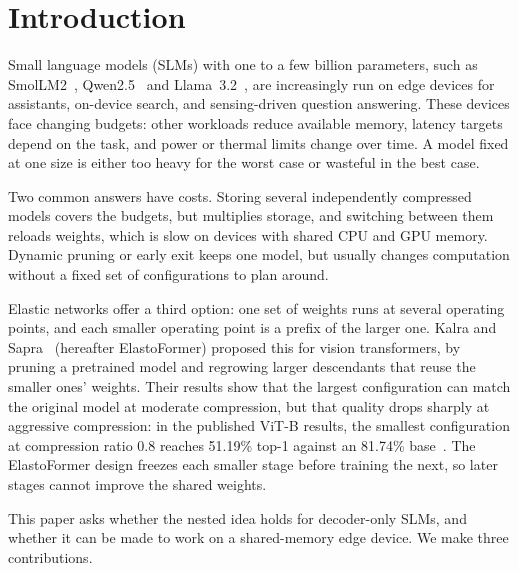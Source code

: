 \section{Introduction}

Small language models (SLMs) with one to a few billion parameters, such as SmolLM2~\cite{allal2025smollm2}, Qwen2.5~\cite{qwen2025qwen25} and Llama~3.2~\cite{meta2024llama32}, are increasingly run on edge devices for assistants, on-device search, and sensing-driven question answering. These devices face changing budgets: other workloads reduce available memory, latency targets depend on the task, and power or thermal limits change over time. A model fixed at one size is either too heavy for the worst case or wasteful in the best case.

Two common answers have costs. Storing several independently compressed models covers the budgets, but multiplies storage, and switching between them reloads weights, which is slow on devices with shared CPU and GPU memory. Dynamic pruning or early exit keeps one model, but usually changes computation without a fixed set of configurations to plan around.

Elastic networks offer a third option: one set of weights runs at several operating points, and each smaller operating point is a prefix of the larger one. Kalra and Sapra~\cite{kalra2025elastoformer} (hereafter ElastoFormer) proposed this for vision transformers, by pruning a pretrained model and regrowing larger descendants that reuse the smaller ones' weights. Their results show that the largest configuration can match the original model at moderate compression, but that quality drops sharply at aggressive compression: in the published ViT-B results, the smallest configuration at compression ratio 0.8 reaches 51.19\% top-1 against an 81.74\% base~\cite{kalra2025elastoformer}. The ElastoFormer design freezes each smaller stage before training the next, so later stages cannot improve the shared weights.

This paper asks whether the nested idea holds for decoder-only SLMs, and whether it can be made to work on a shared-memory edge device. We make three contributions.

